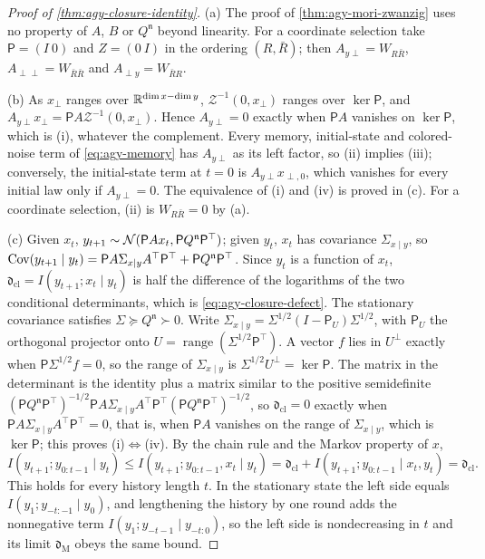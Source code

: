 \begin{proof}[Proof of \cref{thm:agy-closure-identity}]
(a) The proof of \cref{thm:agy-mori-zwanzig} uses no property of $A$, $B$ or $Q^{\mathfrak n}$ beyond linearity. For a coordinate selection take $\mathsf P=(I\ 0)$ and $Z=(0\ I)$ in the ordering $(R,\bar R)$; then $A_{y\perp}=W_{R\bar R}$, $A_{\perp\perp}=W_{\bar R\bar R}$ and $A_{\perp y}=W_{\bar RR}$.

(b) As $x_\perp$ ranges over $\mathbb{R}^{\dim x-\dim y}$, $\mathcal Z^{-1}(0,x_\perp)$ ranges over $\ker\mathsf P$, and $A_{y\perp}x_\perp=\mathsf PA\mathcal Z^{-1}(0,x_\perp)$. Hence $A_{y\perp}=0$ exactly when $\mathsf PA$ vanishes on $\ker\mathsf P$, which is (i), whatever the complement. Every memory, initial-state and colored-noise term of \eqref{eq:agy-memory} has $A_{y\perp}$ as its left factor, so (ii) implies (iii); conversely, the initial-state term at $t=0$ is $A_{y\perp}x_{\perp,0}$, which vanishes for every initial law only if $A_{y\perp}=0$. The equivalence of (i) and (iv) is proved in (c). For a coordinate selection, (ii) is $W_{R\bar R}=0$ by (a).

(c) Given $x_t$, $y_{t+1}\sim\mathcal{N}(\mathsf PAx_t,\mathsf PQ^{\mathfrak n}\mathsf P^\top)$; given $y_t$, $x_t$ has covariance $\Sigma_{x\mid y}$, so $\operatorname{Cov}(y_{t+1}\mid y_t)=\mathsf PA\Sigma_{x\mid y}A^\top\mathsf P^\top+\mathsf PQ^{\mathfrak n}\mathsf P^\top$. Since $y_t$ is a function of $x_t$, $\mathfrak d_{\mathrm{cl}}=I(y_{t+1};x_t\mid y_t)$ is half the difference of the logarithms of the two conditional determinants, which is \eqref{eq:agy-closure-defect}. The stationary covariance satisfies $\Sigma\succeq Q^{\mathfrak n}\succ0$. Write $\Sigma_{x\mid y}=\Sigma^{1/2}(I-\mathsf P_U)\Sigma^{1/2}$, with $\mathsf P_U$ the orthogonal projector onto $U=\operatorname{range}(\Sigma^{1/2}\mathsf P^\top)$. A vector $f$ lies in $U^\perp$ exactly when $\mathsf P\Sigma^{1/2}f=0$, so the range of $\Sigma_{x\mid y}$ is $\Sigma^{1/2}U^\perp=\ker\mathsf P$. The matrix in the determinant is the identity plus a matrix similar to the positive semidefinite $(\mathsf PQ^{\mathfrak n}\mathsf P^\top)^{-1/2}\mathsf PA\Sigma_{x\mid y}A^\top\mathsf P^\top(\mathsf PQ^{\mathfrak n}\mathsf P^\top)^{-1/2}$, so $\mathfrak d_{\mathrm{cl}}=0$ exactly when $\mathsf PA\Sigma_{x\mid y}A^\top\mathsf P^\top=0$, that is, when $\mathsf PA$ vanishes on the range of $\Sigma_{x\mid y}$, which is $\ker\mathsf P$; this proves (i)$\Leftrightarrow$(iv). By the chain rule and the Markov property of $x$,
\begin{equation*}
I(y_{t+1};y_{0:t-1}\mid y_t)\le I(y_{t+1};y_{0:t-1},x_t\mid y_t)=\mathfrak d_{\mathrm{cl}}+I(y_{t+1};y_{0:t-1}\mid x_t,y_t)=\mathfrak d_{\mathrm{cl}}.
\end{equation*}
This holds for every history length $t$. In the stationary state the left side equals $I(y_1;y_{-t:-1}\mid y_0)$, and lengthening the history by one round adds the nonnegative term $I(y_1;y_{-t-1}\mid y_{-t:0})$, so the left side is nondecreasing in $t$ and its limit $\mathfrak d_{\mathrm M}$ obeys the same bound.


\end{proof}
